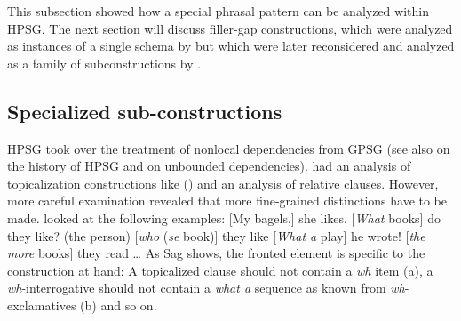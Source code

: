 \documentclass[output=paper]{langsci/langscibook}
\begin{document}



This subsection showed how a special phrasal pattern can be analyzed within HPSG. The next section
will discuss filler-gap constructions, which were analyzed as instances of a single schema by
\citet{ps2} but which were later reconsidered and analyzed as a family of subconstructions by
.

\subsection{Specialized sub-constructions}

HPSG took over the treatment of nonlocal dependencies from GPSG \citep{Gazdar81} (see also
 on the history of HPSG and  on
unbounded dependencies). \citet[Chapters~4 and~5]{ps2} had
an analysis of topicalization constructions like () and an analysis of relative
clauses. However, more careful examination revealed that more fine-grained distinctions have to be
made. \citet[]{Sag2010b} looked at the following examples:
\settowidth{}
\eal
\ex {}[My bagels,] she likes.                           
\ex {}[\emph{What} books] do they like?                  
\ex (the person) [\emph{who} (\emph{se} book)] they like  
\ex {}[\emph{What a} play] he wrote!                     
\ex {}[\emph{the more} books] they read \ldots          {}
\zl
As Sag shows, the fronted element is specific to the construction at hand:
\eal
{}
\zl
A topicalized clause should not contain a \emph{wh} item (a), a \emph{wh}-interrogative should not
contain a \emph{what a} sequence as known from \emph{wh}-exclamatives (b) and so on.
\end{document}
